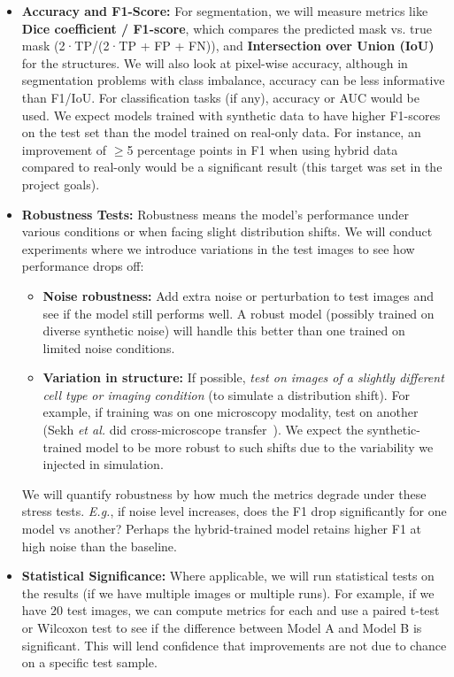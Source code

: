 \documentclass[
oneside,      %
openany       %
]{imc-inf}
\begin{document}
	\begin{itemize}
		\item \textbf{Accuracy and F1-Score:} For segmentation, we will measure metrics like \textbf{Dice coefficient / F1-score}, which compares the predicted mask vs. true mask (2·TP/(2·TP + FP + FN)), and \textbf{Intersection over Union (IoU)} for the structures. We will also look at pixel-wise accuracy, although in segmentation problems with class imbalance, accuracy can be less informative than F1/IoU. For classification tasks (if any), accuracy or AUC would be used. We expect models trained with synthetic data to have higher F1-scores on the test set than the model trained on real-only data. For instance, an improvement of \(\geq\)5 percentage points in F1 when using hybrid data compared to real-only would be a significant result (this target was set in the project goals).
		
		\item \textbf{Robustness Tests:} Robustness means the model’s performance under various conditions or when facing slight distribution shifts. We will conduct experiments where we introduce variations in the test images to see how performance drops off:
		\begin{itemize}
			\item \textbf{Noise robustness:} Add extra noise or perturbation to test images and see if the model still performs well. A robust model (possibly trained on diverse synthetic noise) will handle this better than one trained on limited noise conditions.
			
			\item \textbf{Variation in structure:} If possible, \emph{test on images of a slightly different cell type or imaging condition} (to simulate a distribution shift). For example, if training was on one microscopy modality, test on another (Sekh \emph{et al.} did cross-microscope transfer~\cite{sekh2021}). We expect the synthetic-trained model to be more robust to such shifts due to the variability we injected in simulation.
		\end{itemize}
		
		We will quantify robustness by how much the metrics degrade under these stress tests. \emph{E.g.}, if noise level increases, does the F1 drop significantly for one model vs another? Perhaps the hybrid-trained model retains higher F1 at high noise than the baseline.
		
		\item \textbf{Statistical Significance:} Where applicable, we will run statistical tests on the results (if we have multiple images or multiple runs). For example, if we have 20 test images, we can compute metrics for each and use a paired t-test or Wilcoxon test to see if the difference between Model A and Model B is significant. This will lend confidence that improvements are not due to chance on a specific test sample.
		

\end{itemize}
\end{document}

